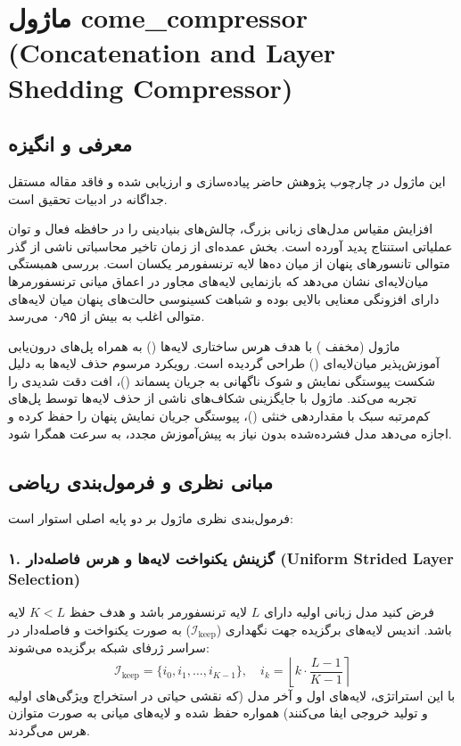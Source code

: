 \section{ماژول come\_compressor (Concatenation and Layer Shedding Compressor)}
\label{sec:module_come_compressor}

\subsection{معرفی و انگیزه}
این ماژول در چارچوب پژوهش حاضر پیاده‌سازی و ارزیابی شده و فاقد مقاله مستقل جداگانه در ادبیات تحقیق است.

افزایش مقیاس مدل‌های زبانی بزرگ، چالش‌های بنیادینی را در حافظه فعال و توان عملیاتی استنتاج پدید آورده است. بخش عمده‌ای از زمان تاخیر محاسباتی ناشی از گذر متوالی تانسورهای پنهان از میان ده‌ها لایه ترنسفورمر یکسان است. بررسی همبستگی میان‌لایه‌ای نشان می‌دهد که بازنمایی لایه‌های مجاور در اعماق میانی ترنسفورمرها دارای افزونگی معنایی بالایی بوده و شباهت کسینوسی حالت‌های پنهان میان لایه‌های متوالی اغلب به بیش از ۰٫۹۵ می‌رسد.

ماژول  (مخفف ) با هدف هرس ساختاری لایه‌ها () به همراه پل‌های درون‌یابی آموزش‌پذیر میان‌لایه‌ای () طراحی گردیده است. رویکرد مرسوم حذف لایه‌ها به دلیل شکست پیوستگی نمایش و شوک ناگهانی به جریان پسماند ()، افت دقت شدیدی را تجربه می‌کند. ماژول  با جایگزینی شکاف‌های ناشی از حذف لایه‌ها توسط پل‌های کم‌مرتبه سبک با مقداردهی خنثی ()، پیوستگی جریان نمایش پنهان را حفظ کرده و اجازه می‌دهد مدل فشرده‌شده بدون نیاز به پیش‌آموزش مجدد، به سرعت همگرا شود.

\subsection{مبانی نظری و فرمول‌بندی ریاضی}
فرمول‌بندی نظری ماژول  بر دو پایه اصلی استوار است:

\subsubsection*{۱. گزینش یکنواخت لایه‌ها و هرس فاصله‌دار (Uniform Strided Layer Selection)}
فرض کنید مدل زبانی اولیه دارای $L$ لایه ترنسفورمر باشد و هدف حفظ $K < L$ لایه باشد. اندیس لایه‌های برگزیده جهت نگهداری ($\mathcal{I}_{\text{keep}}$) به صورت یکنواخت و فاصله‌دار در سراسر ژرفای شبکه برگزیده می‌شوند:
\begin{equation}
\mathcal{I}_{\text{keep}} = \{i_0, i_1, \dots, i_{K-1}\}, \quad i_k = \left\lfloor k \cdot \frac{L-1}{K-1} \right\rceil
\end{equation}
با این استراتژی، لایه‌های اول و آخر مدل (که نقشی حیاتی در استخراج ویژگی‌های اولیه و تولید خروجی ایفا می‌کنند) همواره حفظ شده و لایه‌های میانی به صورت متوازن هرس می‌گردند.

